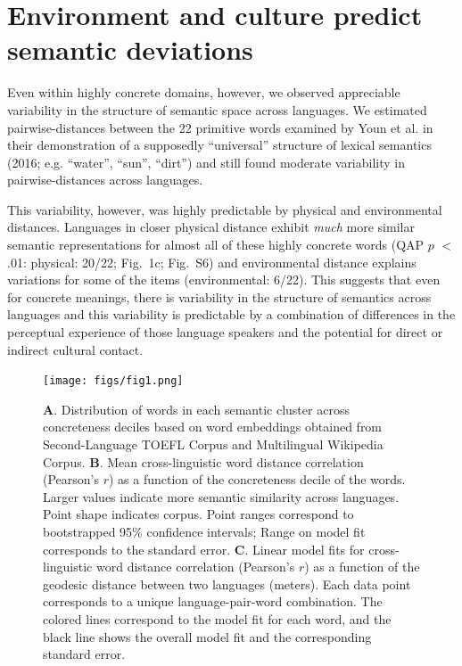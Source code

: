 \documentclass[9pt,twocolumn,twoside,lineno]{pnas-new}
\begin{document}
\section*{Environment and culture predict semantic deviations}
Even within highly concrete domains, however, we observed appreciable variability in the structure of semantic space across languages. We estimated pairwise-distances between the 22 primitive words examined by Youn et al. in their demonstration of a supposedly ``universal'' structure of lexical semantics (2016; e.g. ``water'', ``sun'', ``dirt'') and still found moderate variability in pairwise-distances across languages. 

This variability, however, was highly predictable by physical and environmental distances. Languages in closer physical distance exhibit \textit{much} more similar semantic representations for almost all of these highly concrete words (QAP $p$ $<$ .01: physical: 20/22; Fig.\ 1c;  Fig.\ S6) and environmental distance explains variations for some of the items (environmental: 6/22). This suggests that even for concrete meanings, there is variability in the structure of semantics across languages and this variability is predictable by a combination of differences in the perceptual experience of those language speakers and the potential for direct or indirect cultural contact.  



\begin{figure}[t!]
\centering
\texttt{[image: figs/fig1.png]}
\caption{{\textbf A.} Distribution of words in each semantic cluster across concreteness deciles based on word embeddings obtained from Second-Language TOEFL Corpus and  Multilingual Wikipedia Corpus. {\textbf B.} Mean cross-linguistic word distance correlation (Pearson's $r$) as a function of the concreteness decile of the words. Larger values indicate more semantic similarity across languages. Point shape indicates corpus.  Point ranges correspond to bootstrapped 95\% confidence intervals; Range on model fit corresponds to the standard error. {\textbf C.} Linear model fits for cross-linguistic word distance correlation (Pearson's $r$) as a function of the geodesic distance between two languages (meters). Each data point corresponds to a unique language-pair-word combination. The colored lines correspond to the model fit for each word, and the black line shows the overall model fit and the corresponding standard error.}
\label{fig:fig1} 
\end{figure}
\end{document}
